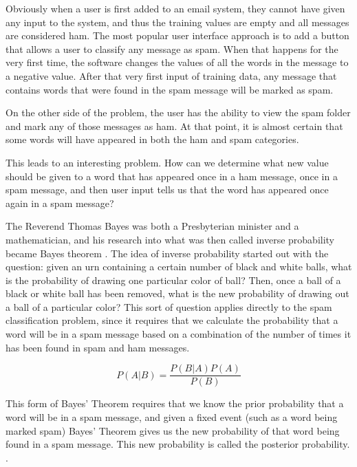 \documentclass[12pt]{article}
\begin{document}
Obviously when a user is first added to an email system, they cannot have given any input to the system, and
thus the training values are empty and all messages are considered ham. The most popular user interface
approach is to add a button that allows a user to classify any message as spam. When that happens for the very
first time, the software changes the values of all the words in the message to a negative value. After that
very first input of training data, any message that contains words that were found in the spam message will be
marked as spam.

On the other side of the problem, the user has the ability to view the spam folder and mark any of those
messages as ham. At that point, it is almost certain that some words will have appeared in both the ham and
spam categories.

This leads to an interesting problem. How can we determine what new value should be given to a word that has
appeared once in a ham message, once in a spam message, and then user input tells us that the word has
appeared once again in a spam message?

The Reverend Thomas Bayes was both a Presbyterian minister and a mathematician, and his research into what was
then called inverse probability became Bayes theorem \citep{barnard1958studies}. The idea of inverse
probability started out with the question: given an urn containing a certain number of black and white balls,
what is the probability of drawing one particular color of ball? Then, once a ball of a black or white ball
has been removed, what is the new probability of drawing out a ball of a particular color? This sort of
question applies directly to the spam classification problem, since it requires that we calculate the
probability that a word will be in a spam message based on a combination of the number of times it has been
found in spam and ham messages.

$$P(A|B)= \dfrac{P(B|A)P(A)}{P(B)}$$

This form of Bayes' Theorem requires that we know the prior probability that a word will be in a spam message,
and given a fixed event (such as a word being marked spam) Bayes' Theorem gives us the new probability of that
word being found in a spam message. This new probability is called the posterior probability.
\citep{bernardo1979reference}.
\end{document}
